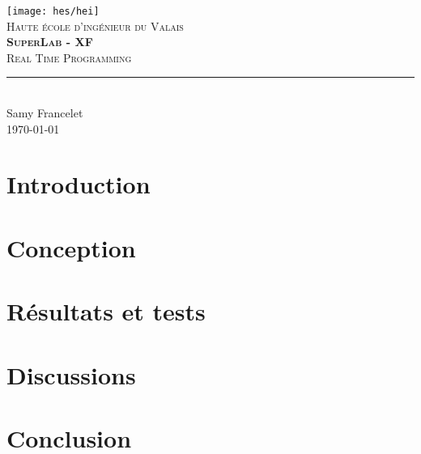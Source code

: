 \documentclass[11pt,titlepage]{report}
\begin{document}
\begin{titlepage}
	\centering
    \texttt{[image: hes/hei]}\\[1cm] 	%
    \textsc{\LARGE Haute école d'ingénieur du Valais}\\ \vspace{\fill}
    \textbf{\textsc{\fontsize{35}{35}\selectfont SuperLab - XF}}\\ \vspace{\fill}
	\textsc{\LARGE Real Time Programming}\\[0.4cm]
	\rule{\linewidth}{0.2 mm}\\[0.5cm]
	Samy Francelet \\
	\today
\end{titlepage}
\restoregeometry

\tableofcontents

\chapter{Introduction}


\chapter{Conception}


\chapter{Résultats et tests}


\chapter{Discussions}


\chapter{Conclusion}


\end{document}
